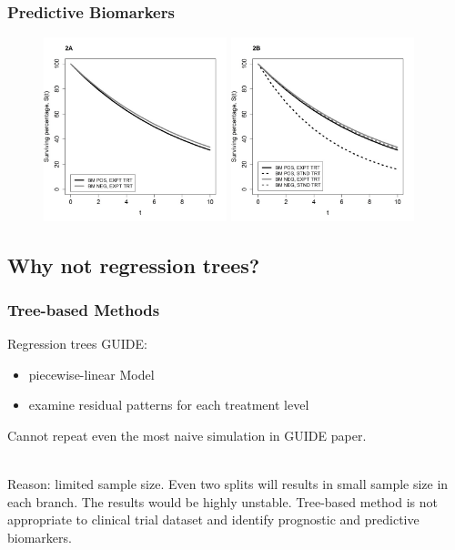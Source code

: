 \documentclass{beamer}
\begin{document}
\begin{frame}
\frametitle{Predictive Biomarkers}

\begin{figure}
    \includegraphics[width=0.475\textwidth]{predictive3.jpg}
    \hfill
    \includegraphics[width=0.475\textwidth]{predictive4.jpg}
 \end{figure}

\end{frame}




\subsection{Why not regression trees?}

\begin{frame}
\frametitle{Tree-based Methods}

Regression trees GUIDE\cite{loh}:

\begin{itemize}
    \item piecewise-linear Model
    \item examine residual patterns for each treatment level
\end{itemize}

Cannot repeat even the most naive simulation in GUIDE paper.\\~

Reason: limited sample size. Even two splits will results in small sample size in each branch. The results would be highly unstable. Tree-based method is not appropriate
to clinical trial dataset and identify prognostic and predictive biomarkers.

\end{frame}
\end{document}
